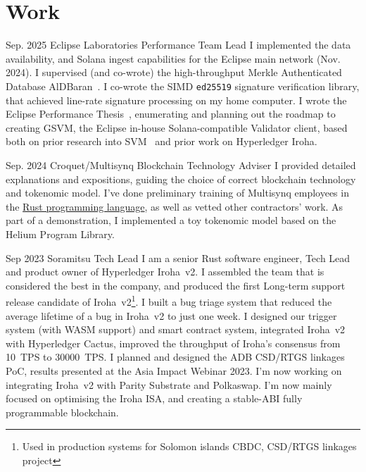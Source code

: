 \documentclass{CurriculumVitae}[10pt, condensed]
\author{Aleksandr Petrosyan}
\date{\today}
\begin{document}
\maketitle


\vfill
\section*{Work}
%
{Sep. 2025}%
{Eclipse Laboratories}%
{Performance Team Lead}%
{%
  I implemented the data availability, and Solana ingest capabilities
  for the Eclipse main network (Nov. 2024).  I supervised (and
  co-wrote) the high-throughput Merkle Authenticated Database
  AlDBaran~\cite{kauer2025aldbaranblazinglyfaststate}.  I co-wrote the
  SIMD \texttt{ed25519} signature verification library, that achieved
  line-rate signature processing on my home computer.  I wrote the
  Eclipse Performance Thesis~\cite{eclipse-thesis}, enumerating and
  planning out the roadmap to creating GSVM, the Eclipse in-house
  Solana-compatible Validator client, based both on prior research
  into SVM~\cite{turan-svm} and prior work on Hyperledger Iroha.
}%

%
    {Sep. 2024}%
    {Croquet/Multisynq}%
    {Blockchain Technology Adviser}%
    {%
      I provided detailed explanations and expositions, guiding the
      choice of correct blockchain technology and tokenomic model.
      I've done preliminary training of Multisynq employees in the
      \href{https://github.com/Greybeard-Entertainment/rust}{Rust
        programming language}, as well as vetted other contractors'
      work.  As part of a demonstration, I implemented a toy tokenomic
      model based on the Helium Program Library.
    }%

    {Sep 2023}%
    {Soramitsu}%
    {Tech Lead}%
    {%
      I am a senior Rust software engineer, Tech Lead and product
      owner of Hyperledger Iroha~v2.  I assembled the team that is
      considered the best in the company, and produced the first
      Long-term support release candidate of Iroha~v2\footnote{Used in
        production systems for Solomon islands CBDC, CSD/RTGS linkages
        project}. I built a bug triage system that reduced the average
      lifetime of a bug in Iroha~v2 to just one week. I designed our
      trigger system (with WASM support) and smart contract system,
      integrated Iroha~v2 with Hyperledger Cactus, improved the
      throughput of Iroha's consensus from 10~TPS to 30000~TPS. I
      planned and designed the ADB CSD/RTGS linkages PoC, results
      presented at the Asia Impact Webinar 2023.  I'm now working on
      integrating Iroha~v2 with Parity Substrate and Polkaswap.  I'm
      now mainly focused on optimising the Iroha ISA, and creating a
      stable-ABI fully programmable blockchain.
    }%
\end{document}
